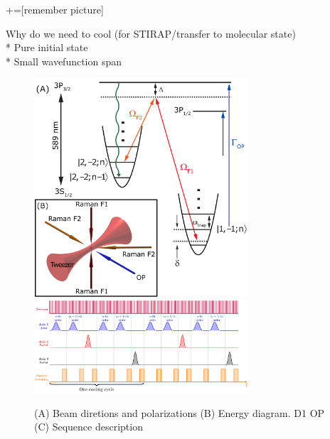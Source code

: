 \documentclass[aps,twocolumn,secnumarabic,balancelastpage,amsmath,amssymb,nofootinbib]{revtex4}
\begin{document}
+=[remember picture]
\title{}
\author{}
\date{\today}

\begin{abstract}
\end{abstract}

\maketitle

Why do we need to cool (for STIRAP/transfer to molecular state)\\

* Pure initial state\\
* Small wavefunction span\\

\begin{figure}
  \includegraphics[width=8cm]{imgs/Na_RSC_schematic.pdf}\\
  \includegraphics[width=8cm]{sequence.pdf}
  \caption{(A) Beam diretions and polarizations
    (B) Energy diagram. D1 OP
    (C) Sequence description}
  \label{f-setup}
\end{figure}
\end{document}

